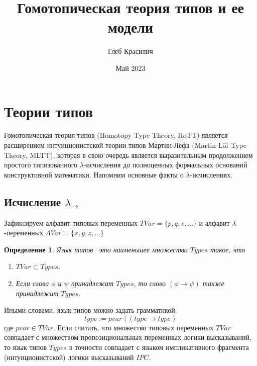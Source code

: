 \documentclass{article}[12pt]
\title{Гомотопическая теория типов и ее модели}
\author{Глеб Красилич}
\date{Май 2023}
\newtheorem{definition}{Определение}
\newcommand{\dash}{\textemdash\ }
\begin{document}
\maketitle

\section{Теории типов}

Гомотопическая теория типов (Homotopy Type Theory, HoTT) является расширением интуиционистской теории типов
Мартин-Лёфа (Martin-Löf Type Theory, MLTT), которая в свою очередь является выразительным
продолжением простого типизованного $\lambda$-исчисления до полноценных формальных оснований конструктивной математики.
Напомним основные факты о $\lambda$-исчислениях.

\subsection{Исчисление $\lambda_\rightarrow$}

Зафиксируем алфавит типовых переменных $TVar = \{p, q, v, \dots \}$ и алфавит $\lambda$-переменных
$\Lambda Var = \{x, y, z, \dots \}$
\begin{definition}
    Язык типов \dash это наименьшее множество $Types$ такое, что
    \begin{enumerate}
        \item $TVar \subset Types$.
        \item Если слова $\phi$ и $\psi$ принадлежат $Types$, то слово $(\phi \rightarrow \psi)$
        также принадлежит $Types$.
    \end{enumerate}
\end{definition}
Иными словами, язык типов можно задать грамматикой
$$type := pvar \; | \; (type \rightarrow type)$$
где $pvar \in TVar$. Если считать, что множество типовых переменных $TVar$ совпадает с множеством
пропозициональных переменных логики высказываний, то язык типов $Types$ в точности совпадает с
языком импликативного фрагмента (интуиционистской) логики высказываний $IPC$.  
\end{document}
